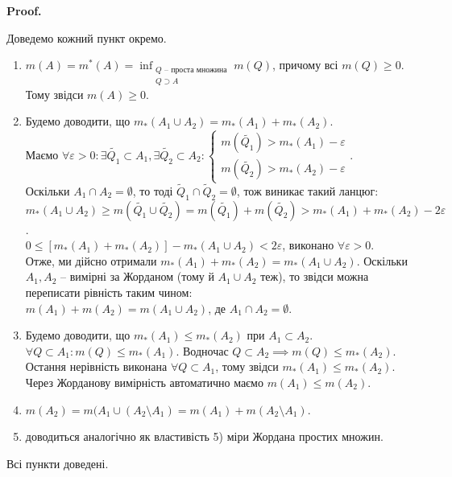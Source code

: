 \documentclass[a4paper, 10pt]{article}
\makeatletter
\def\qed{$\blacksquare$}
\theoremstyle{theoremdd}
\theoremstyle{theoremdd}
\theoremstyle{theoremdd}
\theoremstyle{theoremdd}
\theoremstyle{theoremdd}
\theoremstyle{theoremdd}
\theoremstyle{theoremdd}
\theoremstyle{theoremdd}
\theoremstyle{theoremdd}
\theoremstyle{theoremdd}
\theoremstyle{theoremdd}
\theoremstyle{theoremdd}
\theoremstyle{theoremdd}
\theoremstyle{theoremdd}
\theoremstyle{theoremdd}
\renewenvironment{proof}[1][Proof.\\]{\par
\pushQED{\hfill \qed}%
\normalfont \topsep6\p@\@plus6\p@\relax
\trivlist
\item\relax
{\bfseries
#1\@addpunct{.}}\hspace\labelsep\ignorespaces
}{%
\popQED\endtrivlist\@endpefalse
}
\makeatother
\begin{document}
\begin{proof}
Доведемо кожний пункт окремо.
\begin{enumerate}[wide=0pt,label={\arabic*)}]
\item $m(A) = m^*(A) = \displaystyle\inf_{\substack{Q \text{ -- проста множина} \\ Q \supset A}} m(Q)$, причому всі $m(Q) \geq 0$. Тому звідси $m(A) \geq 0$.\\
\item Будемо доводити, що $m_*(A_1 \cup A_2) = m_*(A_1) + m_*(A_2)$.
\iffalse
Маємо, що $\forall Q_1 \subset A_1, \forall Q_2 \subset A_2: \begin{cases} m(Q_1) \leq m_*(A_1) \\ m(Q_2) \leq m_*(A_2) \end{cases}$. Важливо зауважити, що оскільки $A_1 \cap A_2 = \emptyset$, то також $Q_1 \cap Q_2 = \emptyset$, а тому $m(Q_1 \cup Q_2) = m(Q_1) + m(Q_2) \leq m*(A_1) + m_*(A_2)$ -- нерівність виконана $\forall Q_1 \cup Q_2 \subset A_1 \cup A_2$.\\
Таким чином, $m_*(A_1) + m_*(A_2)$ -- "верхня грань" для $\lambda(Q)$, де $Q \subset A_1 \cup A_2$, а тому \\
$m_*(A_1 \cup A_2) \leq m_*(A_1) + m_*(A_2)$.\\
\fi \\
Маємо $\forall \varepsilon > 0: \exists \tilde{Q_1} \subset A_1, \exists \tilde{Q_2} \subset A_2: \begin{cases} m(\tilde{Q_1}) > m_*(A_1) - \varepsilon \\ m(\tilde{Q_2}) > m_*(A_2) - \varepsilon \end{cases}$.\\
Оскільки $A_1 \cap A_2 = \emptyset$, то тоді $\tilde{Q}_1 \cap \tilde{Q}_2 = \emptyset$, тож виникає такий ланцюг:\\
$m_*(A_1 \cup A_2) \geq m(\tilde{Q_1} \cup \tilde{Q_2}) = m(\tilde{Q_1}) + m(\tilde{Q_2}) > m_*(A_1) + m_*(A_2) - 2\varepsilon$.\\
$0 \leq [m_*(A_1) + m_*(A_2)] - m_*(A_1 \cup A_2) < 2\varepsilon$, виконано $\forall \varepsilon > 0$.\\
Отже, ми дійсно отримали $m_*(A_1) + m_*(A_2) = m_*(A_1 \cup A_2)$. Оскільки $A_1,A_2$ -- вимірні за Жорданом (тому й $A_1 \cup A_2$ теж), то звідси можна переписати рівність таким чином:\\
$m(A_1) + m(A_2) = m(A_1 \cup A_2)$, де $A_1 \cap A_2 = \emptyset$.
\item Будемо доводити, що $m_*(A_1) \leq m_*(A_2)$ при $A_1 \subset A_2$.\\
$\forall Q \subset A_1: m(Q) \leq m_*(A_1)$. Водночас $Q \subset A_2 \implies m(Q) \leq m_*(A_2)$.\\
Остання нерівність виконана $\forall Q \subset A_1$, тому звідси $m_*(A_1) \leq m_*(A_2)$. Через Жорданову вимірність автоматично маємо $m(A_1) \leq m(A_2)$.
\item $m(A_2) = m(A_1 \cup (A_2 \setminus A_1) = m(A_1) + m(A_2 \setminus A_1)$.
\item доводиться аналогічно як властивість 5) міри Жордана простих множин.
\end{enumerate}
Всі пункти доведені.
\end{proof}
\end{document}
